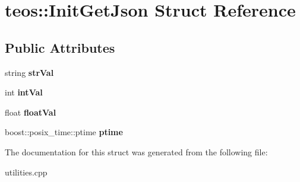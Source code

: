 \hypertarget{structteos_1_1_init_get_json}{}\section{teos\+:\+:Init\+Get\+Json Struct Reference}
\label{structteos_1_1_init_get_json}
\subsection*{Public Attributes}
\begin{DoxyCompactItemize}
\item 
\mbox{\label{structteos_1_1_init_get_json_ae52964bccbe6d0f23f0e01586a8855b9}} 
string {\bfseries str\+Val}
\item 
\mbox{\label{structteos_1_1_init_get_json_ae86e224b84a021705317a0cf3e788f1f}} 
int {\bfseries int\+Val}
\item 
\mbox{\label{structteos_1_1_init_get_json_a30a13c796a6829e1b9ec711519012d64}} 
float {\bfseries float\+Val}
\item 
\mbox{\label{structteos_1_1_init_get_json_a01c32cb0438e072c44cf5206ef0075d0}} 
boost\+::posix\+\_\+time\+::ptime {\bfseries ptime}
\end{DoxyCompactItemize}


The documentation for this struct was generated from the following file\+:\begin{DoxyCompactItemize}
\item 
utilities.\+cpp\end{DoxyCompactItemize}
